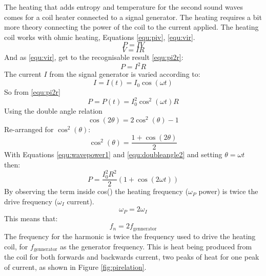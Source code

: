 The heating that adds entropy and temperature for the second sound waves 
comes for a coil heater connected to a signal generator.
The heating requires a bit more theory connecting
the power of the coil to the current applied.
The heating coil works with ohmic heating, Equations \ref{equ:piv}, \ref{equ:vir}.
\begin{equation}
P=IV \label{equ:piv}
\end{equation}
\begin{equation}
V=IR \label{equ:vir}
\end{equation}
And as \ref{equ:vir}, get to
the recognisable result \ref{equ:pi2r}:
\begin{equation}
\label{equ:pi2r}
P=I^2 R
\end{equation}
The current $I$ from the signal generator is varied
according to:
\begin{equation}
\label{equ:wavegenneratorI}
I = I(t) = I_0 \cos(\omega t)
\end{equation}
So from \ref{equ:pi2r}
\begin{equation}
\label{equ:wavepower1}
P = P(t) = I_0^2  \cos^2(\omega t) R
\end{equation}
Using the double angle relation
\begin{equation}
\label{equ:doubleangle1}
\cos(2\theta) = 2 \cos^2(\theta) - 1
\end{equation}
Re-arranged for $\cos^2(\theta)$:
\begin{equation}
\label{equ:doubleangle2}
\cos^2(\theta) = \frac{1 + \cos(2 \theta)}{2}
\end{equation}
With Equations \ref{equ:wavepower1} and \ref{equ:doubleangle2}
and setting $\theta = \omega t$ then:
\begin{equation}
\label{equ:powerequation}
P = \frac{I_0^2 R^2}{2} \left( 1 + \cos(2\omega t)\right)
\end{equation}
By observing the term inside cos() the heating frequency
($\omega_P$ power) is twice the drive frequency ($\omega_I$ current).
\begin{equation}
\label{equ:powercurrrentfrequencyrel}
\omega_P = 2 \omega_I
\end{equation}
This means that:
\begin{equation}
\label{equ:gennyfreqheatfreq}
f_n = 2 f_\text{gennerator}
\end{equation}
The frequency for the harmonic is twice the frequency used to drive the heating
coil, for $f_\text{gennerator}$ as the generator frequency.
This is heat being produced from the coil for both forwards and backwards current,
two peaks of heat for one peak of current, as shown in Figure \ref{fig:pirelation}.

